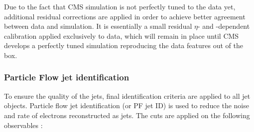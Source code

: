 

Due to the fact that CMS simulation is not perfectly tuned to the data yet, additional residual corrections are applied
in order to achieve better agreement between data and simulation. It is essentially a small residual $\eta$- and
\pt-dependent calibration applied exclusively to data, which will remain in place until CMS develops a perfectly tuned
simulation reproducing the data features out of the box.



\subsubsection{Particle Flow jet identification}
\label{sss:PFJet_ID}
To ensure the quality of the jets, final identification criteria are applied to all jet objects. Particle flow jet
identification (or PF jet ID) is used to reduce the noise and rate of electrons reconstructed as jets. The cuts are
applied on the following observables :


